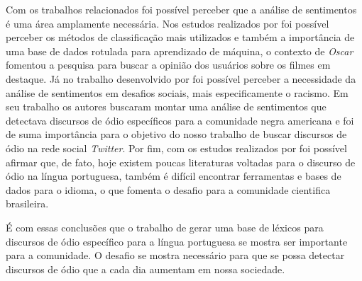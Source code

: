 Com os trabalhos relacionados foi possível perceber que a análise de sentimentos é uma área amplamente necessária. Nos estudos realizados por  foi possível perceber os métodos de classificação mais utilizados e também a importância de uma base de dados rotulada para aprendizado de máquina, o contexto de \textit{Oscar} fomentou a pesquisa para buscar a opinião dos usuários sobre os filmes em destaque. Já no trabalho desenvolvido por  foi possível perceber a necessidade da análise de sentimentos em desafios sociais, mais especificamente o racismo. Em seu trabalho os autores buscaram montar uma análise de sentimentos que detectava discursos de ódio específicos para a comunidade negra americana e foi de suma importância para o objetivo do nosso trabalho de buscar discursos de ódio na rede social \textit{Twitter}. Por fim, com os estudos realizados por  foi possível afirmar que, de fato, hoje existem poucas literaturas voltadas para o discurso de ódio na língua portuguesa, também é difícil encontrar ferramentas e bases de dados para o idioma, o que fomenta o desafio para a comunidade cientifica brasileira.

É com essas conclusões que o trabalho de gerar uma base de léxicos para discursos de ódio específico para a língua portuguesa se mostra ser importante para a comunidade. O desafio se mostra necessário para que se possa detectar discursos de ódio que a cada dia aumentam em nossa sociedade. 